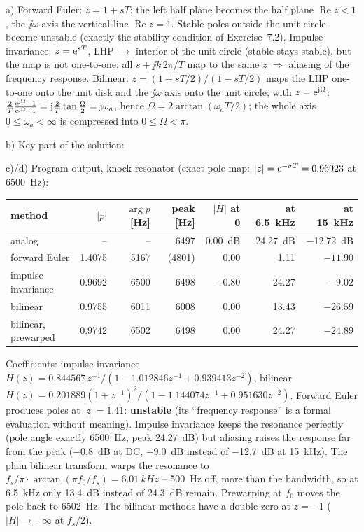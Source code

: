 \begin{solution}
a) Forward Euler: $z=1+sT$; the left half plane becomes the half plane
$\operatorname{Re}z<1$, the $\jj\omega$ axis the vertical line
$\operatorname{Re}z=1$. Stable poles outside the unit circle become unstable
(exactly the stability condition of Exercise~7.2). Impulse invariance:
$z=\mathrm{e}^{sT}$, LHP $\rightarrow$ interior of the unit circle (stable stays
stable), but the map is not one-to-one: all $s+\jj k\,2\pi/T$ map to the same
$z$ $\Rightarrow$ aliasing of the frequency response. Bilinear:
$z=(1+sT/2)/(1-sT/2)$ maps the LHP one-to-one onto the unit disk and the
$\jj\omega$ axis onto the unit circle; with $z=\mathrm{e}^{\mathrm{j}\Omega}$:
$\frac2T\frac{\mathrm{e}^{\mathrm{j}\Omega}-1}{\mathrm{e}^{\mathrm{j}\Omega}+1}=\mathrm{j}\frac2T\tan\frac\Omega2=\mathrm{j}\omega_a$,
hence $\Omega=2\arctan(\omega_aT/2)$; the whole axis $0\le\omega_a<\infty$ is
compressed into $0\le\Omega<\pi$.

b) Key part of the solution:

c)/d) Program output, knock resonator (exact pole map: $|z|=\mathrm{e}^{-\sigma T}=0.96923$
at \SI{6500}{Hz}):
\begin{center}\small
\begin{tabular}{lrrrrrr}
\toprule
method & $|p|$ & $\arg p$ [Hz] & peak [Hz] & $|H|$ at 0 & at \SI{6.5}{kHz} & at \SI{15}{kHz}\\
\midrule
analog & -- & -- & 6497 & \SI{0.00}{dB} & \SI{24.27}{dB} & \SI{-12.72}{dB}\\
forward Euler & 1.4075 & 5167 & (4801) & 0.00 & 1.11 & $-11.90$\\
impulse invariance & 0.9692 & 6500 & 6498 & $-0.80$ & 24.27 & $-9.02$\\
bilinear & 0.9755 & 6011 & 6008 & 0.00 & 13.43 & $-26.59$\\
bilinear, prewarped & 0.9742 & 6502 & 6498 & 0.00 & 24.27 & $-24.89$\\
\bottomrule
\end{tabular}
\end{center}
Coefficients: impulse invariance $H(z)=0.844567\,z^{-1}/(1-1.012846z^{-1}+0.939413z^{-2})$,
bilinear $H(z)=0.201889(1+z^{-1})^2/(1-1.144074z^{-1}+0.951630z^{-2})$.
Forward Euler produces poles at $|z|=1.41$: \textbf{unstable} (its
``frequency response'' is a formal evaluation without meaning). Impulse
invariance keeps the resonance perfectly (pole angle exactly \SI{6500}{Hz},
peak \SI{24.27}{dB}) but aliasing raises the response far from the peak
(\SI{-0.8}{dB} at DC, \SI{-9.0}{dB} instead of \SI{-12.7}{dB} at \SI{15}{kHz}).
The plain bilinear transform warps the resonance to
$f_s/\pi\cdot\arctan(\pi f_0/f_s)=\SI{6.01}{kHz}$ -- \SI{500}{Hz} off, more than the
bandwidth, so at \SI{6.5}{kHz} only \SI{13.4}{dB} instead of \SI{24.3}{dB}
remain. Prewarping at $f_0$ moves the pole back to \SI{6502}{Hz}. The bilinear
methods have a double zero at $z=-1$ ($|H|\rightarrow-\infty$ at $f_s/2$).


\end{solution}
